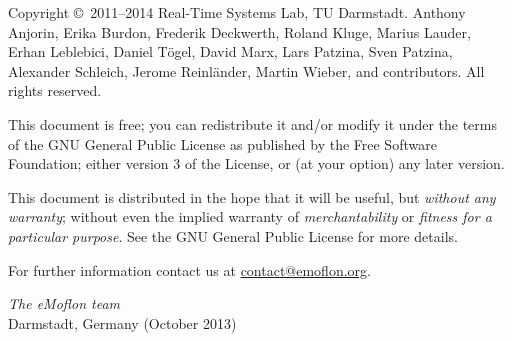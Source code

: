 \begin{small} 
Copyright \copyright~2011--2014 Real-Time Systems Lab, TU Darmstadt.
Anthony Anjorin, Erika Burdon, Frederik Deckwerth, Roland Kluge, Marius Lauder,
Erhan Leblebici, Daniel T\"ogel, David Marx, Lars Patzina, Sven Patzina, Alexander
Schleich, Jerome Reinl\"ander, Martin Wieber, and contributors.
All rights reserved.

This document is free; you can redistribute it and/or modify it under the terms of the GNU General Public License as published by the Free Software Foundation; either version 3 of the License, or (at your option) any later version.
 
This document is distributed in the hope that it will be useful, but \emph{without any warranty}; without even the implied warranty of \emph{merchantability} or \emph{fitness for a particular purpose}.
See the GNU General Public License for more details.
 
  
For further information contact us at
\href{mailto:contact@emoflon.org}{contact@emoflon.org}.
  
\vskip3cm
\textit{The eMoflon team}\\
Darmstadt, Germany (October 2013)
\end{small}
